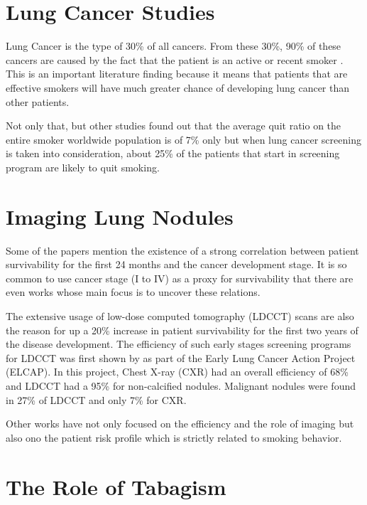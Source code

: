 \section{Lung Cancer Studies}

Lung Cancer is the type of 30\% of all cancers. From these 30\%, 90\% of these cancers are  caused by the fact that the patient is an active or recent smoker \cite{jaklitsch2012, nccn2019, roberts2013}. This is an important literature finding because it means that patients that are effective smokers will have much greater chance of developing lung cancer than other patients.

Not only that, but other studies found out that the average quit ratio on the entire smoker worldwide population is of 7\% only but when lung  cancer screening is taken into consideration, about 25\% of the patients that start in screening program are likely to quit smoking\cite{fox2003, aalst2010}. 
\section{Imaging Lung Nodules}

Some of the papers mention the existence of a strong correlation between patient survivability for the first 24 months and the cancer development stage. It is so common to use cancer stage (I to IV) as a proxy for survivability that there are even works whose main focus is to uncover these relations\cite{roberts2013, fox2003}.

The extensive usage of low-dose computed tomography (LDCCT) scans are also the reason for up a 20\% increase in patient survivability for the first two years of the disease development\cite{fox2003, macredmond2006, mountain2008, jaklitsch2012}. The efficiency of such early stages screening programs for LDCCT was first shown by  as part of the Early Lung Cancer Action  Project (ELCAP). In this project, Chest X-ray (CXR) had an overall efficiency of 68\% and LDCCT had a 95\% for non-calcified nodules. Malignant nodules were found in 27\% of LDCCT and only 7\% for CXR. 

Other works have not only focused on the efficiency and the role of imaging but also ono the patient risk profile which is strictly related to smoking behavior.

\section{The Role of Tabagism}

